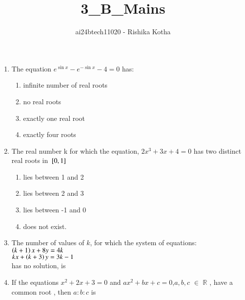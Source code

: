 \documentclass[journal,12pt,onecolumn]{IEEEtran}
\theoremstyle{remark}
\begin{document}

\vspace{3cm}

\title{3\_B\_Mains}
\author{ai24btech11020 - Rishika Kotha}

\maketitle
\bigskip       
\renewcommand{\thefigure}{\theenumi}
\renewcommand{\thetable}{\theenumi}

\begin{enumerate}[start=24]
\item The equation $e^{\sin x}-e^{-\sin x}-4=0$ has:
	\hfill {}
	\begin{enumerate}[label=\alph*.]
	\item  infinite number of real roots
	\item  no real roots
	\item  exactly one real root
	\item  exactly four roots
	\end{enumerate}
\item The real number k for which the equation, $2x^3+3x+4=0$ has two distinct real roots in ${}\left[0,1\right]$
        \hfill {}
	\begin{enumerate}[label=\alph*.]
        \item  lies between 1 and 2
	\item  lies between 2 and 3
	\item  lies between -1 and 0
	\item  does not exist.
	\end{enumerate}
\item The number of values of $k$, for which the system of equations:\\
	$\left(k+1\right)x+8y=4k$\\
	$kx+\left(k+3\right)y=3k-1$\\
has no solution, is\hfill {}
        \begin{enumerate}[label=\alph*.]
	\begin{multicols}{2}
	\item   infinite
	\item     1
	\item     2
	\item     3
	\end{multicols}
	\end{enumerate}
\item If the equations $x^2+2x+3=0$ and $ax^2+bx+c=0$,$a,b,c$ $\in$ $\mathbb{R}$ , have a common root , then $a:b:c$ is

\end{enumerate}
\end{document}
